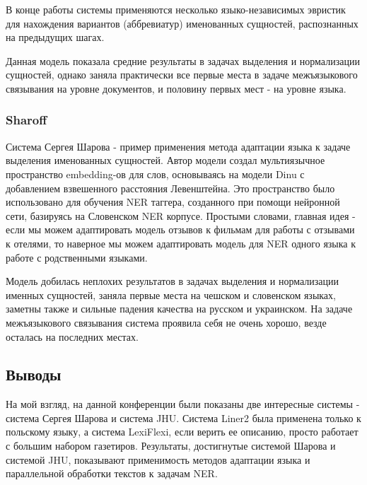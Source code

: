 В конце работы системы применяются несколько языко-независимых эвристик для нахождения вариантов (аббревиатур) именованных сущностей, распознанных на предыдущих шагах.

Данная модель показала средние результаты в задачах выделения и нормализации сущностей, однако заняла практически все первые места в задаче межъязыкового связывания на уровне документов, и половину первых мест - на уровне языка.

\subsubsection{Sharoff}

Система Сергея Шарова \cite{sharoff:2017:BSNLP} - пример применения метода адаптации языка к задаче выделения именованных сущностей. Автор модели создал мультиязычное пространство embedding-ов для слов, основываясь на модели Dinu с добавлением взвешенного расстояния Левенштейна. Это пространство было использовано для обучения NER таггера, созданного при помощи нейронной сети, базируясь на Словенском NER корпусе. Простыми словами, главная идея - если мы можем адаптировать модель отзывов к фильмам для работы с отзывами к отелями, то наверное мы можем адаптировать модель для NER одного языка к работе с родственными языками.

Модель добилась неплохих результатов в задачах выделения и нормализации именных сущностей, заняла первые места на чешском и словенском языках, заметны также и сильные падения качества на русском и украинском. На задаче межъязыкового связывания система проявила себя не очень хорошо, везде осталась на последних местах. 

\subsection{Выводы}

На мой взгляд, на данной конференции были показаны две интересные системы - система Сергея Шарова и система JHU. Система Liner2 была применена только к польскому языку, а система LexiFlexi, если верить ее описанию, просто работает с большим набором газетиров. Результаты, достигнутые системой Шарова и системой JHU, показывают применимость методов адаптации языка и параллельной обработки текстов к задачам NER.